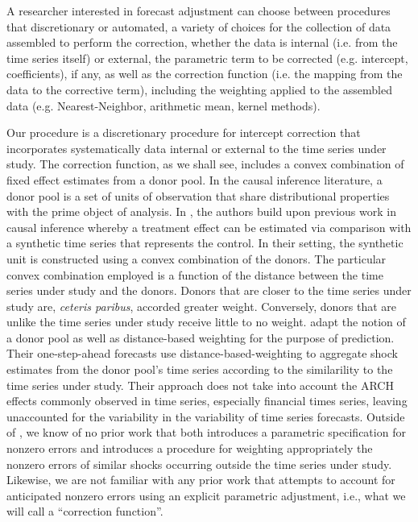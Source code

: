 \documentclass[11pt,3p,review,authoryear]{elsarticle}
\theoremstyle{definition}
\begin{document}
A researcher interested in forecast adjustment can choose between procedures that discretionary or automated, a variety of choices for the collection of data assembled to perform the correction, whether the data is internal (i.e. from the time series itself) or external, the parametric term to be corrected (e.g. intercept, coefficients), if any, as well as the correction function (i.e. the mapping from the data to the corrective term), including the weighting applied to the assembled data (e.g. Nearest-Neighbor, arithmetic mean, kernel methods).

Our procedure is a discretionary procedure for intercept correction that  incorporates systematically data internal or external to the time series under study.  The correction function, as we shall see, includes a convex combination of fixed effect estimates from a donor pool.  In  the causal inference literature, a donor pool is a set of units of observation that share distributional properties with the prime object of analysis.  In \citet{abadie2010synthetic}, the authors build upon previous work in causal inference whereby a treatment effect can be estimated via comparison with a synthetic time series that represents the control.  In their setting, the synthetic unit is constructed using a convex combination of the donors.  The particular convex combination employed is a function of the distance between the time series under study and the donors.  Donors that are closer to the time series under study are, \textit{ceteris paribus}, accorded greater weight.  Conversely, donors that are unlike the time series under study receive little to no weight.  \citet{lin2021minimizing} adapt the notion of a donor pool as well as distance-based weighting for the purpose of prediction.  Their one-step-ahead forecasts use distance-based-weighting to aggregate shock estimates from the donor pool's time series according to the similarility to the time series under study.  Their approach does not take into account the ARCH effects commonly observed in time series, especially financial times series, leaving unaccounted for the variability in the variability of time series forecasts.  Outside of \citet{lin2021minimizing}, we know of no prior work that both introduces a parametric specification for nonzero errors and introduces a procedure for weighting appropriately the nonzero errors of similar shocks occurring outside the time series under study.  Likewise, we are not familiar with any prior work that attempts to account for anticipated nonzero errors using an explicit parametric adjustment, i.e., what we will call a ``correction function''.  
\end{document}
